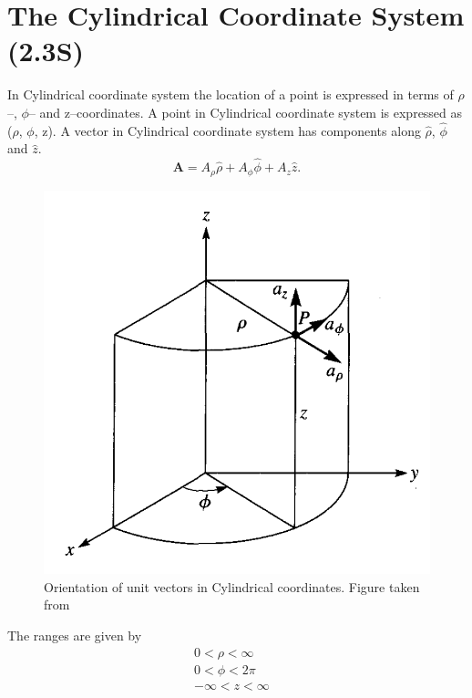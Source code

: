 \documentclass[12pt,a4paper]{article}
\begin{document}
\section{The Cylindrical Coordinate System (2.3S)}
In Cylindrical coordinate system the location of a point is expressed in terms of $\rho$--, $\phi$-- and z--coordinates. A point in Cylindrical coordinate system is expressed as ($\rho$, $\phi$, z). A vector in Cylindrical coordinate system has components along $\hat \rho$, $\hat \phi$ and $\hat z$.
\begin{equation}
\textbf{A}=A_\rho\hat \rho+A_\phi\hat \phi+ A_z\hat z.
\end{equation}
\begin{figure}[H]
\centering
\includegraphics[scale=0.45]{Figure2-1S.png}
\caption{Orientation of unit vectors in Cylindrical coordinates. Figure taken from~\cite[Figure 2.1, page 29]{Sadiku}}
\label{Unit-vectors-cylindrical-coordinates}
\end{figure}
The ranges are given by
\begin{equation*}
\begin{split}
0 < \rho < \infty&\\
0 < \phi < 2\pi&\\
-\infty < z < \infty&\\
\end{split}
\end{equation*}
\end{document}
